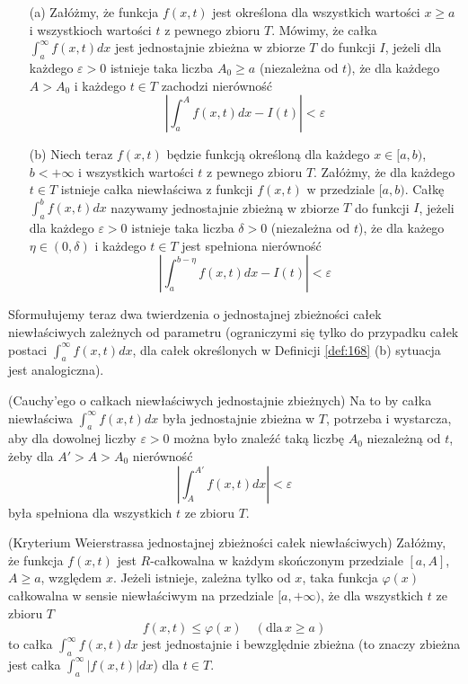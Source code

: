 \documentclass[leqno]{article}
\begin{document}
\begin{justify}
\begin{defn}
    \begin{itemize}
        \item [(a)]
            Załóżmy, że funkcja $f(x,t)$ jest określona dla wszystkich wartości $x \geqslant a$ i wszystkioch wartości $t$ z pewnego zbioru $T$.
            Mówimy, że całka $\int_{a}^{\infty}f(x,t)dx$ jest jednostajnie zbieżna w zbiorze $T$ do funkcji $I$, jeżeli 
            dla każdego $\varepsilon > 0$ istnieje taka liczba $A_0 \geqslant a$ (niezależna od $t$), że dla każdego $A > A_0$ i każdego $t \in T$ zachodzi nierówność 
            \[
                \left| \int_{a}^{A}f(x,t)dx - I(t) \right| < \varepsilon
            \]
        \item [(b)]
            Niech teraz $f(x,t)$ będzie funkcją określoną dla każdego $x \in [a,b)$, $b < +\infty$ i wszystkich wartości $t$ z pewnego zbioru $T$.
            Załóżmy, że dla każdego $t \in T$ istnieje całka niewłaściwa z funkcji $f(x,t)$ w przedziale $[a,b)$.
            Całkę $\int_{a}^{b}f(x,t)dx$ nazywamy jednostajnie zbieżną w zbiorze $T$ do funkcji $I$, jeżeli dla każdego $\varepsilon > 0$ istnieje taka liczba $\delta > 0$
            (niezależna od $t$), że dla każego $\eta \in (0, \delta)$ i każdego $t \in T$ jest spełniona nierówność 
            \[
                \left| \int_{a}^{b-\eta}f(x,t)dx - I(t) \right| < \varepsilon
            \]
    \end{itemize}
\end{defn}

Sformułujemy teraz dwa twierdzenia o jednostajnej zbieżności całek niewłaściwych zależnych od parametru (ograniczymi się tylko do przypadku całek postaci 
$\int_{a}^{\infty}f(x,t)dx$, dla całek określonych w Definicji \ref{def:168} (b) sytuacja jest analogiczna).

\begin{theorem}
{
    (Cauchy'ego o całkach niewłaściwych jednostajnie zbieżnych) 
    Na to by całka niewłaściwa $\int_{a}^{\infty}f(x,t)dx$ była jednostajnie zbieżna w $T$, potrzeba i wystarcza, aby dla dowolnej liczby $\varepsilon > 0$
    można było znaleźć taką liczbę $A_0$ niezależną od $t$, żeby dla $A' > A > A_0$ nierówność 
    \[
        \left| \int_{A}^{A'}f(x,t)dx \right | < \varepsilon
    \]
    była spełniona dla wszystkich $t$ ze zbioru $T$.
}
\end{theorem}

\begin{theorem}
{
    (Kryterium Weierstrassa jednostajnej zbieżności całek niewłaściwych)
    Załóżmy, że funkcja $f(x,t)$ jest $R$-całkowalna w każdym skończonym przedziale $[a,A]$, $A \geqslant a$, względem $x$.
    Jeżeli istnieje, zależna tylko od $x$, taka funkcja $\varphi(x)$ całkowalna w sensie niewłaściwym na przedziale $[a,+\infty)$,
    że dla wszystkich $t$ ze zbioru $T$
    \[
        f(x,t) \leqslant \varphi(x) \quad (\text{dla} \, x \geqslant a)
    \]
    to całka $\int_{a}^{\infty}f(x,t)dx$ jest jednostajnie i bewzględnie zbieżna (to znaczy zbieżna jest całka $\int_{a}^{\infty}|f(x,t)|dx$) dla $t \in T$.
}
\end{theorem}


\end{justify}
\end{document}

